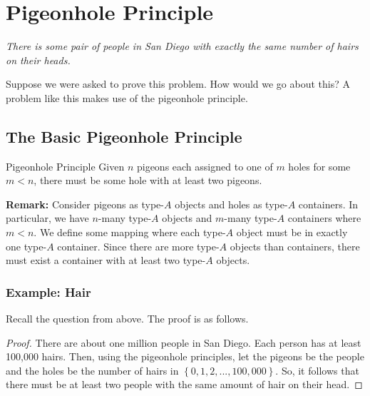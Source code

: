 \documentclass[letterpaper]{article}
\begin{document}
\newpage
\section{Pigeonhole Principle}
\emph{There is some pair of people in San Diego with exactly the same number of hairs on their heads.}

\bigskip 

Suppose we were asked to prove this problem. How would we go about this? A problem like this makes use of the pigeonhole principle. 

\subsection{The Basic Pigeonhole Principle}
\begin{theorem}{Pigeonhole Principle}{}
    Given $n$ pigeons each assigned to one of $m$ holes for some $m < n$, there must be some hole with at least two pigeons. 
\end{theorem}
\textbf{Remark:} Consider pigeons as type-$A$ objects and holes as type-$A$ containers. In particular, we have $n$-many type-$A$ objects and $m$-many type-$A$ containers where $m < n$. We define some mapping where each type-$A$ object must be in exactly one type-$A$ container. Since there are more type-$A$ objects than containers, there must exist a container with at least two type-$A$ objects.

\subsubsection{Example: Hair}
Recall the question from above. The proof is as follows.
\begin{proof}
    There are about one million people in San Diego. Each person has at least 100,000 hairs. Then, using the pigeonhole principles, let the pigeons be the people and the holes be the number of hairs in $\left\{0, 1, 2, ..., 100,000\right\}$. So, it follows that there must be at least two people with the same amount of hair on their head.
\end{proof}
\end{document}
